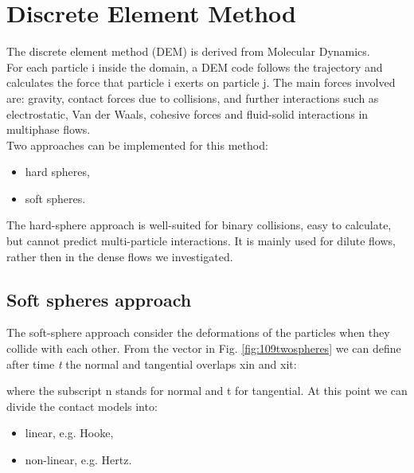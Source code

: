 
\chapter{Discrete Element Method}
\label{cap:dem}

The discrete element method (\acs{DEM}) is derived from Molecular Dynamics. \\ 
For each particle i inside the domain, a \acs{DEM} code
follows the trajectory and calculates the force that particle i exerts on particle j.
The main forces involved are: gravity, contact forces due to collisions, and
further interactions such as electrostatic, Van der Waals, cohesive forces and fluid-solid interactions in 
multiphase flows. \\
Two approaches can be implemented for this method:
\begin{itemize}
  \item{hard spheres,}
  \item{soft spheres.}
\end{itemize} 
The hard-sphere approach is well-suited for binary collisions, easy to
calculate, but cannot predict multi-particle interactions.
It is mainly used for dilute flows, rather then in the dense flows we
investigated.


\section{Soft spheres approach}
\label{sec:softspheresapproach}


The soft-sphere approach consider the deformations of the particles when they
collide with each other. From the vector in Fig. \ref{fig:109twospheres} we can
define after time \textit{t} the normal and tangential overlaps \acs{xin} and
\acs{xit}:


where the subscript \acs{n} stands for normal and \acs{t} for tangential. 
At this point we can divide the contact models into:
\begin{itemize}
  \item{linear, e.g. Hooke,}
  \item{non-linear, e.g. Hertz.}
\end{itemize}

